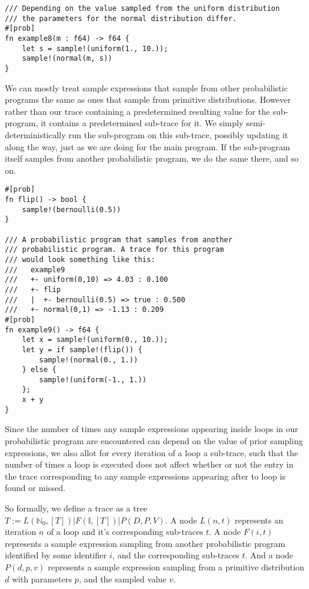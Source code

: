 \begin{minipage}{\linewidth}
\begin{lstlisting}
/// Depending on the value sampled from the uniform distribution
/// the parameters for the normal distribution differ.
#[prob]
fn example8(m : f64) -> f64 {
    let s = sample!(uniform(1., 10.));
    sample!(normal(m, s))
}
\end{lstlisting}
\end{minipage}

We can mostly treat sample expressions that sample from other probabilistic programs the same as ones that sample from primitive distributions. However rather than our trace containing a predetermined resulting value for the sub-program, it contains a predetermined sub-trace for it. We simply semi-deterministically run the sub-program on this sub-trace, possibly updating it along the way, just as we are doing for the main program. If the sub-program itself samples from another probabilistic program, we do the same there, and so on.

\begin{minipage}{\linewidth}
\begin{lstlisting}
#[prob]
fn flip() -> bool {
    sample!(bernoulli(0.5))
}

/// A probabilistic program that samples from another
/// probabilistic program. A trace for this program
/// would look something like this:
///   example9
///   +- uniform(0,10) => 4.03 : 0.100
///   +- flip
///   |  +- bernoulli(0.5) => true : 0.500
///   +- normal(0,1) => -1.13 : 0.209
#[prob]
fn example9() -> f64 {
    let x = sample!(uniform(0., 10.));
    let y = if sample!(flip()) {
        sample!(normal(0., 1.))
    } else {
        sample!(uniform(-1., 1.))
    };
    x + y
}
\end{lstlisting}
\end{minipage}

Since the number of times any sample expressions appearing inside loops in our probabilistic program are encountered can depend on the value of prior sampling expressions, we also allot for every iteration of a loop a sub-trace, such that the number of times a loop is executed does not affect whether or not the entry in the trace corresponding to any sample expressions appearing after to loop is found or missed.

So formally, we define a trace as a tree $T := L(\mathbb{N}_0, [T]) | F(\mathbb{I}, [T]) | P(D,P,V)$. A node $L(n,t)$ represents an iteration $n$ of a loop and it's corresponding sub-traces $t$. A node $F(i, t)$ represents a sample expression sampling from another probabilistic program identified by some identifier $i$, and the corresponding sub-traces $t$. And a node $P(d,p,v)$ represents a sample expression sampling from a primitive distribution $d$ with parameters $p$, and the sampled value $v$.

